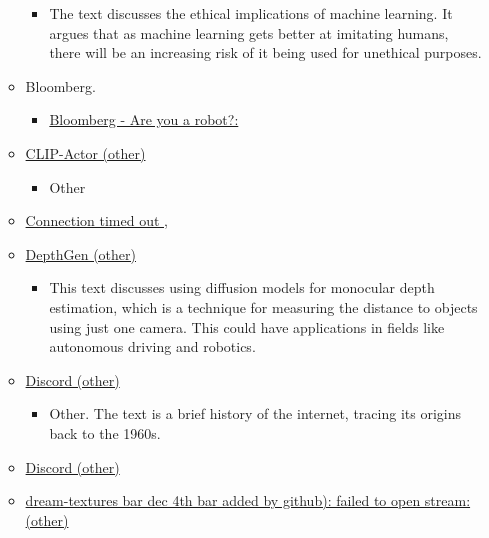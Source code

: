 \begin{itemize}
\begin{itemize}
    \begin{itemize}
     
    \item
      The text discusses the ethical implications of machine learning.
      It argues that as machine learning gets better at imitating
      humans, there will be an increasing risk of it being used for
      unethical purposes.
    \end{itemize}
  \item
    Bloomberg.

    \begin{itemize}
     
    \item
      \href{https://www.bloomberg.com/news/articles/2023-02-21/amazon-s-aws-joins-with-ai-startup-hugging-face-as-chatgpt-competition-heats-up}{Bloomberg
      - Are you a robot?:}
    \end{itemize}
  \item
    \href{https://clip-actor.github.io}{CLIP-Actor (other)}

    \begin{itemize}
     
    \item
      Other
    \end{itemize}
  \item
    \href{https://donnerlab.com/}{Connection timed out ,}
  \item
    \href{https://depth-gen.github.io/}{DepthGen (other)}

    \begin{itemize}
     
    \item
      This text discusses using diffusion models for monocular depth
      estimation, which is a technique for measuring the distance to
      objects using just one camera. This could have applications in
      fields like autonomous driving and robotics.
    \end{itemize}
  \item
    \href{https://discord.gg/2xndhbssvv}{Discord (other)}

    \begin{itemize}
     
    \item
      Other. The text is a brief history of the internet, tracing its
      origins back to the 1960s.
    \end{itemize}
  \item
    \href{https://discord.gg/tpd9h8kvbd}{Discord (other)}
  \item
    \href{https://github.com/carson-katri/dream-textures\%7Ccarson-katri/dream-textures\%3Ecarson-katri/dream-textures\%20\%7C\%20dec\%204th\%20\%7C\%20added\%20by\%20github}{dream-textures
    bar{} dec 4th bar{} added by github): failed to open
    stream: (other)}


\end{itemize}
\end{itemize}
